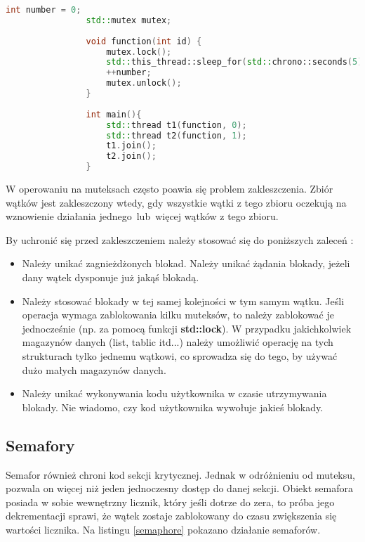 {{\begin{lstlisting}[caption=Przykład użycia muteksów w języku C++, language=C++, label=mutex]
                int number = 0;
                std::mutex mutex;
                 
                void function(int id) {
                    mutex.lock();
                    std::this_thread::sleep_for(std::chrono::seconds(5));
                    ++number;
                    mutex.unlock();
                }
                 
                int main(){
                    std::thread t1(function, 0);
                    std::thread t2(function, 1);
                    t1.join();
                    t2.join(); 
                }
        \end{lstlisting}
    
        \newpage
    
        W operowaniu na muteksach często poawia się problem zakleszczenia. Zbiór wątków jest zakleszczony wtedy, gdy wszystkie wątki z tego zbioru oczekują na wznowienie działania jednego~lub~więcej wątków z tego zbioru.
    
        By uchronić się przed zakleszczeniem należy stosować się do poniższych zaleceń \cite{threads_williams}:
        \begin{itemize}
            \item Należy unikać zagnieżdżonych blokad. Należy unikać żądania blokady, jeżeli dany wątek dysponuje już jakąś blokadą.
            \item Należy stosować blokady w tej samej kolejności w tym samym wątku.
                    Jeśli operacja wymaga zablokowania kilku muteksów, to należy zablokować je jednocześnie (np. za pomocą funkcji \textbf{std::lock}). W przypadku jakichkolwiek magazynów danych (list, tablic itd...) należy umożliwić operację na tych strukturach tylko jednemu wątkowi, co sprowadza się do tego, by używać dużo małych magazynów danych.
            \item 	Należy unikać wykonywania kodu użytkownika w czasie utrzymywania  blokady.
                    Nie wiadomo, czy kod użytkownika wywołuje jakieś blokady.
        \end{itemize}
        }
    \subsection{Semafory}
    {
        Semafor również chroni kod sekcji krytycznej. Jednak w odróżnieniu od muteksu, pozwala on więcej niż jeden jednoczesny dostęp do danej sekcji. Obiekt semafora posiada w sobie wewnętrzny licznik, który jeśli dotrze do zera, to próba jego dekrementacji sprawi, że wątek zostaje zablokowany do czasu zwiększenia się wartości licznika. Na listingu \ref{semaphore} pokazano działanie semaforów. 

}}
